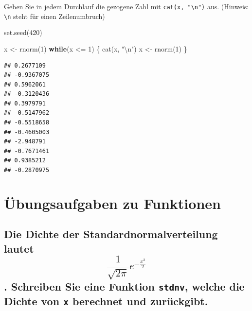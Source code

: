 \documentclass[12pt,a4paper]{article}
\newenvironment{Shaded}{\begin{snugshade}}{\end{snugshade}}
\newcommand{\ControlFlowTok}[1]{\textcolor[rgb]{0.13,0.29,0.53}{\textbf{#1}}}
\newcommand{\DecValTok}[1]{\textcolor[rgb]{0.00,0.00,0.81}{#1}}
\newcommand{\FunctionTok}[1]{\textcolor[rgb]{0.00,0.00,0.00}{#1}}
\newcommand{\NormalTok}[1]{#1}
\newcommand{\OtherTok}[1]{\textcolor[rgb]{0.56,0.35,0.01}{#1}}
\newcommand{\SpecialCharTok}[1]{\textcolor[rgb]{0.00,0.00,0.00}{#1}}
\newcommand{\StringTok}[1]{\textcolor[rgb]{0.31,0.60,0.02}{#1}}
\begin{document}
Geben Sie in jedem Durchlauf die gezogene Zahl mit
\texttt{cat(x,\ "\textbackslash{}n")} aus. (Hinweis:
\texttt{\textbackslash{}n} steht für einen Zeilenumbruch)

\begin{Shaded}
\begin{Highlighting}[]
    \FunctionTok{set.seed}\NormalTok{(}\DecValTok{420}\NormalTok{)}
    
\NormalTok{    x }\OtherTok{\textless{}{-}} \FunctionTok{rnorm}\NormalTok{(}\DecValTok{1}\NormalTok{)}
    \ControlFlowTok{while}\NormalTok{(x }\SpecialCharTok{\textless{}=} \DecValTok{1}\NormalTok{) \{}
      \FunctionTok{cat}\NormalTok{(x, }\StringTok{"}\SpecialCharTok{\textbackslash{}n}\StringTok{"}\NormalTok{)}
\NormalTok{      x }\OtherTok{\textless{}{-}} \FunctionTok{rnorm}\NormalTok{(}\DecValTok{1}\NormalTok{)}
\NormalTok{    \}}
\end{Highlighting}
\end{Shaded}

\begin{verbatim}
## 0.2677109 
## -0.9367075 
## 0.5962061 
## -0.3120436 
## 0.3979791 
## -0.5147962 
## -0.5518658 
## -0.4605003 
## -2.948791 
## -0.7671461 
## 0.9385212 
## -0.2870975
\end{verbatim}

\hypertarget{uxfcbungsaufgaben-zu-funktionen}{%
\section{Übungsaufgaben zu
Funktionen}\label{uxfcbungsaufgaben-zu-funktionen}}

\hypertarget{die-dichte-der-standardnormalverteilung-lautet-displaystyle-frac1sqrt2pi-e-fracx22.-schreiben-sie-eine-funktion-stdnv-welche-die-dichte-von-x-berechnet-und-zuruxfcckgibt.}{%
\subsection{\texorpdfstring{Die Dichte der Standardnormalverteilung
lautet \[\displaystyle \frac{1}{\sqrt{2\pi}} e^{-\frac{x^2}{2}}\].
Schreiben Sie eine Funktion \texttt{stdnv}, welche die Dichte von
\texttt{x} berechnet und
zurückgibt.}{Die Dichte der Standardnormalverteilung lautet \textbackslash displaystyle \textbackslash frac\{1\}\{\textbackslash sqrt\{2\textbackslash pi\}\} e\^{}\{-\textbackslash frac\{x\^{}2\}\{2\}\}. Schreiben Sie eine Funktion stdnv, welche die Dichte von x berechnet und zurückgibt.}}\label{die-dichte-der-standardnormalverteilung-lautet-displaystyle-frac1sqrt2pi-e-fracx22.-schreiben-sie-eine-funktion-stdnv-welche-die-dichte-von-x-berechnet-und-zuruxfcckgibt.}}
\end{document}
